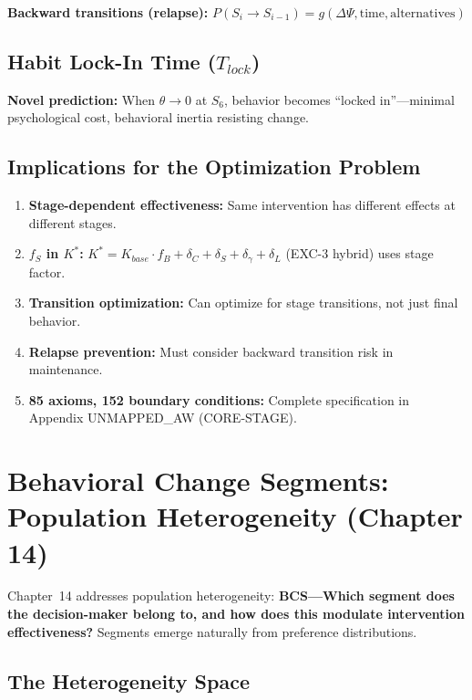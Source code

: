 \textbf{Backward transitions (relapse):} $P(S_i \to S_{i-1}) = g(\Delta\Psi, \text{time}, \text{alternatives})$

\subsection{Habit Lock-In Time ($T_{lock}$)}

\textbf{Novel prediction:} When $\theta \to 0$ at $S_6$, behavior becomes ``locked in''---minimal psychological cost, behavioral inertia resisting change.

\subsection{Implications for the Optimization Problem}

\begin{enumerate}[nosep]
\item \textbf{Stage-dependent effectiveness:} Same intervention has different effects at different stages.
\item \textbf{$f_S$ in $K^*$:} $K^* = K_{base} \cdot f_B + \delta_C + \delta_S + \delta_\gamma + \delta_L$ (EXC-3 hybrid) uses stage factor.
\item \textbf{Transition optimization:} Can optimize for stage transitions, not just final behavior.
\item \textbf{Relapse prevention:} Must consider backward transition risk in maintenance.
\item \textbf{85 axioms, 152 boundary conditions:} Complete specification in Appendix UNMAPPED_AW (CORE-STAGE).
\end{enumerate}

\section{Behavioral Change Segments: Population Heterogeneity (Chapter 14)}
\label{sec:mp-bcs}

Chapter~14 addresses population heterogeneity: \textbf{BCS---Which segment does the decision-maker belong to, and how does this modulate intervention effectiveness?} Segments emerge naturally from preference distributions.

\subsection{The Heterogeneity Space}

